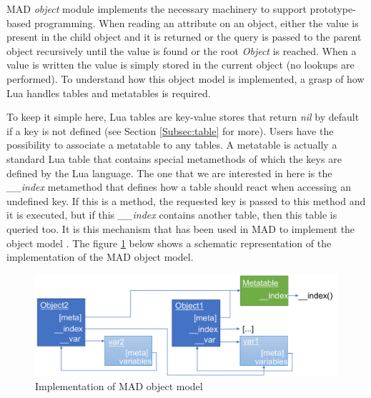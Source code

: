
MAD \emph{object} module implements the necessary machinery to support prototype-based
programming. When reading an attribute on an object, either the value is present
in the child object and it is returned or the query is passed to the parent
object recursively until the value is found or the root \emph{Object} is
reached. When a value is written the value is simply stored in the current
object (no lookups are performed). To understand how this object model is
implemented, a grasp of how Lua handles tables and metatables is required.

To keep it simple here, Lua tables are key-value stores that return \emph{nil} by
default if a key is not defined (see Section \ref{Subsec:table} for more).
Users have the possibility to associate a metatable to any tables. A metatable
is actually a standard Lua table that contains special metamethods of which
the keys are defined by the Lua language. The one that we are interested in here is
the \emph{\_\_index} metamethod that defines how a table should react when accessing
an undefined key. If this is a method, the requested key is passed to this method
and it is executed, but if this \emph{\_\_index} contains another table, then this
table is queried too. It is this mechanism that has been
used in MAD to implement the object model . The figure \ref{fig:MO-descriptinon} below
shows a schematic representation of the implementation of the MAD object model.

\begin{figure}[H]
    \centering
    \includegraphics[width=\textwidth]{./Images/MO.pdf}
    \caption{Implementation of MAD object model}
    \label{fig:MO-descriptinon}
\end{figure}

